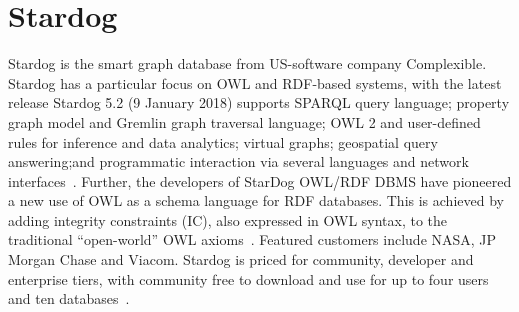 \section{Stardog}
Stardog is the smart graph database from US-software company Complexible.
Stardog has a particular focus on OWL and RDF-based systems, with the latest
release Stardog 5.2 (9 January 2018) supports SPARQL query language; property
graph model and Gremlin graph traversal language; OWL 2 and user-defined rules
for inference and data analytics; virtual graphs; geospatial query answering;and programmatic 
interaction via several languages and network
interfaces~\cite{hid-sp18-405-wwwdocs-stardog}. Further, the developers of
StarDog OWL/RDF DBMS have pioneered a new use of OWL as a schema language for
RDF databases. This is achieved by adding integrity constraints (IC), also
expressed in OWL syntax, to the traditional ``open-world'' OWL
axioms~\cite{hid-sp18-405-cer2012graphical-stardog}. Featured customers include
NASA, JP Morgan Chase and Viacom. Stardog is priced for community, developer and
enterprise tiers, with community free to download and use for up to four users
and ten databases~\cite{hid-sp18-405-www-stardog}.


